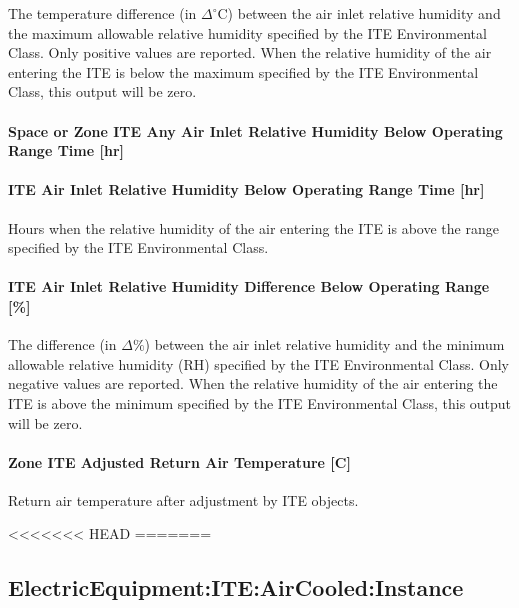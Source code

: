 The temperature difference (in $\Delta^{\circ}$C) between the air inlet relative humidity and the maximum allowable relative humidity specified by the ITE Environmental Class. Only positive values are reported. When the relative humidity of the air entering the ITE is below the maximum specified by the ITE Environmental Class, this output will be zero.

\paragraph{Space or Zone ITE Any Air Inlet Relative Humidity Below Operating Range Time {[}hr{]}}\label{zone-ite-any-air-inlet-relative-humidity-below-operating-range-time-hr}

\paragraph{ITE Air Inlet Relative Humidity Below Operating Range Time {[}hr{]}}\label{ite-air-inlet-relative-humidity-below-operating-range-time-hr}

Hours when the relative humidity of the air entering the ITE is above the range specified by the ITE Environmental Class.

\paragraph{ITE Air Inlet Relative Humidity Difference Below Operating Range {[}\%{]}}\label{ite-air-inlet-relative-humidity-difference-below-operating-range}

The difference (in $\Delta\%$) between the air inlet relative humidity and the minimum allowable relative humidity (RH) specified by the ITE Environmental Class. Only negative values are reported. When the relative humidity of the air entering the ITE is above the minimum specified by the ITE Environmental Class, this output will be zero.

\paragraph{Zone ITE Adjusted Return Air Temperature [C]}

Return air temperature after adjustment by ITE objects.

<<<<<<< HEAD
=======

\subsection{ElectricEquipment:ITE:AirCooled:Instance}\label{electricequipmentiteaircooledinstance}

